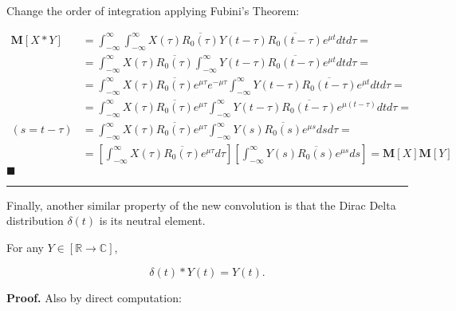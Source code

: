 	Change the order of integration applying Fubini's Theorem:

\begin{align}
	\mathbf{M}\left[X \ast Y\right]	&= \int_{-\infty}^{\infty} \int_{-\infty}^{\infty}X\left(\tau\right) \overline{R_0\left(\tau\right)}Y\left(t - \tau\right)\overline{R_0\left(t - \tau\right)} e^{\mu t}dt d\tau = \nonumber\\[3mm]
%
	&= \int_{-\infty}^{\infty} X\left(\tau\right) \overline{R_0\left(\tau\right)} \int_{-\infty}^{\infty}Y\left(t - \tau\right)\overline{R_0\left(t - \tau\right)} e^{\mu t}dt d\tau = \nonumber\\[3mm]
%
	&= \int_{-\infty}^{\infty} X\left(\tau\right) \overline{R_0\left(\tau\right)}e^{\mu \tau}e^{-\mu \tau} \int_{-\infty}^{\infty}Y\left(t - \tau\right)\overline{R_0\left(t - \tau\right)} e^{\mu t}dt d\tau = \nonumber\\[3mm]
%
	&= \int_{-\infty}^{\infty} X\left(\tau\right) \overline{R_0\left(\tau\right)}e^{\mu \tau} \int_{-\infty}^{\infty}Y\left(t - \tau\right)\overline{R_0\left(t - \tau\right)} e^{\mu \left(t-\tau\right)}dt d\tau = \nonumber\\[3mm]
%
	(s = t - \tau) &= \int_{-\infty}^{\infty} X\left(\tau\right) \overline{R_0\left(\tau\right)}e^{\mu \tau} \int_{-\infty}^{\infty}Y\left(s\right)\overline{R_0\left(s\right)} e^{\mu s} ds d\tau = \nonumber\\[3mm]
	&= \left[\int_{-\infty}^{\infty} X\left(\tau\right) \overline{R_0\left(\tau\right)} e^{\mu \tau}d\tau\right]\left[ \int_{-\infty}^{\infty}Y\left(s\right)\overline{R_0\left(s\right)} e^{\mu s} ds \right] = \mathbf{M}\left[X\right]\mathbf{M}\left[Y\right]
\end{align}
\hfill$\blacksquare$\vspace{5mm}\hrule\vspace{5mm}%

	Finally, another similar property of the new convolution is that the Dirac Delta distribution $\delta(t)$ is its neutral element.

\begin{theorem}\label{theo:delta_neutral} %
	For any $Y\in\left[\mathbb{R}\to\mathbb{C}\right]$,

\begin{equation} \delta(t) \ast Y(t) = Y(t) .\end{equation}
\end{theorem}
\textbf{Proof.} Also by direct computation:

